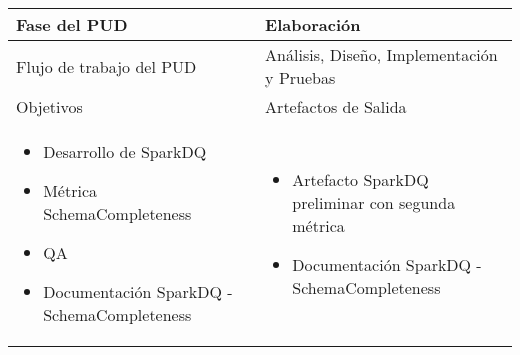 \vspace{1cm}
\begin{tabular}{|p{}|p{}|}

\hline

\cellcolor[gray]{0.7}Fase del \acs{PUD} & Elaboración
 \\
\hline

\cellcolor[gray]{0.7}Flujo de trabajo del \acs{PUD} & Análisis, Diseño,
Implementación y Pruebas
 \\
\hline

\cellcolor[gray]{0.7}Objetivos  &
\cellcolor[gray]{0.7}Artefactos de Salida \\
\hline

\begin{itemize}
\item Desarrollo de SparkDQ
\item Métrica SchemaCompleteness
\item \acs{QA}
\item Documentación SparkDQ - SchemaCompleteness
\end{itemize}

&

\begin{itemize}
\item Artefacto SparkDQ preliminar con segunda métrica
\item Documentación SparkDQ - SchemaCompleteness
\end{itemize}
\\
\hline
\end{tabular}



